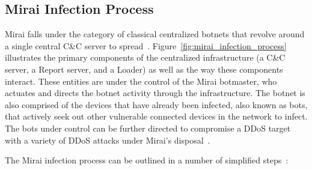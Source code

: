 \subsection{Mirai Infection Process}
\label{sub:mirai_infection_process}
Mirai falls under the category of classical centralized botnets that revolve around a single central C\&C server to spread~\cite{shanmughapriya2018_botnet_of_things_survey}. Figure~\ref{fig:mirai_infection_process} illustrates the primary components of the centralized infrastructure (a C\&C server, a Report server, and a Loader) as well as the way these components interact. These entities are under the control of the Mirai botmaster, who actuates and directs the botnet activity through the infrastructure. The botnet is also comprised of the devices that have already been infected, also known as bots, that actively seek out other vulnerable connected devices in the network to infect. The bots under control can be further directed to compromise a DDoS target with a variety of DDoS attacks under Mirai's disposal~\cite{kambourakis2017mirai}.
\par
The Mirai infection process can be outlined in a number of simplified steps~\cite{kambourakis2017mirai, Antonakakis2017_USENIX_Mirai_First_Study}:
